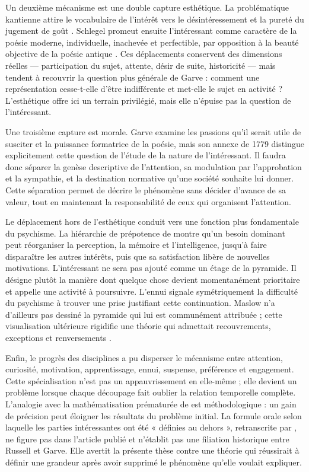 \documentclass[11pt,a4paper]{article}
\begin{document}
Un deuxième mécanisme est une double capture esthétique. La problématique
kantienne attire le vocabulaire de l'intérêt vers le désintéressement et la
pureté du jugement de goût \parencite{kant1993juger}. Schlegel promeut ensuite
l'intéressant comme caractère de la poésie moderne, individuelle, inachevée et
perfectible, par opposition à la beauté objective de la poésie antique
\parencite{schlegel2001study,nannini2018interesting}. Ces déplacements conservent
des dimensions réelles --- participation du sujet, attente, désir de suite,
historicité --- mais tendent à recouvrir la question plus générale de Garve :
comment une représentation cesse-t-elle d'être indifférente et met-elle le sujet
en activité ? L'esthétique offre ici un terrain privilégié, mais elle n'épuise
pas la question de l'intéressant.

Une troisième capture est morale. Garve examine les passions qu'il serait utile
de susciter et la puissance formatrice de la poésie, mais son annexe de 1779
distingue explicitement cette question de l'étude de la nature de
l'intéressant. Il faudra donc séparer la genèse descriptive de l'attention, sa
modulation par l'approbation et la sympathie, et la destination normative qu'une
société souhaite lui donner. Cette séparation permet de décrire le phénomène
sans décider d'avance de sa valeur, tout en maintenant la responsabilité de
ceux qui organisent l'attention.

Le déplacement hors de l'esthétique conduit vers une fonction plus fondamentale
du psychisme. La hiérarchie de prépotence de \textcite{maslow1943motivation}
montre qu'un besoin dominant peut réorganiser la perception, la mémoire et
l'intelligence, jusqu'à faire disparaître les autres intérêts, puis que sa
satisfaction libère de nouvelles motivations. L'intéressant ne sera pas ajouté
comme un étage de la pyramide. Il désigne plutôt la manière dont quelque chose
devient momentanément prioritaire et appelle une activité à poursuivre. L'ennui
signale symétriquement la difficulté du
psychisme à trouver une prise justifiant cette continuation. Maslow n'a d'ailleurs
pas dessiné la pyramide qui lui est communément attribuée ; cette visualisation
ultérieure rigidifie une théorie qui admettait recouvrements, exceptions et
renversements \parencite{bridgman2019maslow}.

Enfin, le progrès des disciplines a pu disperser le mécanisme entre attention,
curiosité, motivation, apprentissage, ennui, suspense, préférence et engagement.
Cette spécialisation n'est pas un appauvrissement en elle-même ; elle devient un
problème lorsque chaque découpage fait oublier la relation temporelle complète.
L'analogie avec la mathématisation prématurée de \textcite{russell1995rationality}
est méthodologique : un gain de précision peut éloigner les résultats du problème
initial. La formule orale selon laquelle les parties intéressantes ont été
« définies au dehors », retranscrite par \textcite{pachet1997representation}, ne
figure pas dans l'article publié et n'établit pas une filiation historique
entre Russell et Garve. Elle avertit la présente thèse contre une théorie qui
réussirait à définir une grandeur après avoir supprimé le phénomène qu'elle
voulait expliquer.
\end{document}
